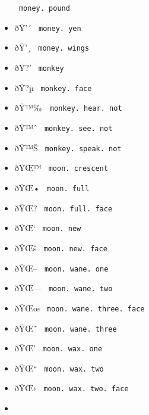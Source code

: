 \begin{itemize}
{  \texttt{\ money.\ pound\ }}
\item
  \label{symbol-money.yen}{{ ðŸ'´ }
  \texttt{\ money.\ yen\ }}
\item
  \label{symbol-money.wings}{{ ðŸ'¸ }
  \texttt{\ money.\ wings\ }}
\item
  \label{symbol-monkey}{{ ðŸ?' } \texttt{\ monkey\ }}
\item
  \label{symbol-monkey.face}{{ ðŸ?µ }
  \texttt{\ monkey.\ face\ }}
\item
  \label{symbol-monkey.hear.not}{{ ðŸ™‰ }
  \texttt{\ monkey.\ hear.\ not\ }}
\item
  \label{symbol-monkey.see.not}{{ ðŸ™ˆ }
  \texttt{\ monkey.\ see.\ not\ }}
\item
  \label{symbol-monkey.speak.not}{{ ðŸ™Š }
  \texttt{\ monkey.\ speak.\ not\ }}
\item
  \label{symbol-moon.crescent}{{ ðŸŒ™ }
  \texttt{\ moon.\ crescent\ }}
\item
  \label{symbol-moon.full}{{ ðŸŒ• }
  \texttt{\ moon.\ full\ }}
\item
  \label{symbol-moon.full.face}{{ ðŸŒ? }
  \texttt{\ moon.\ full.\ face\ }}
\item
  \label{symbol-moon.new}{{ ðŸŒ` }
  \texttt{\ moon.\ new\ }}
\item
  \label{symbol-moon.new.face}{{ ðŸŒš }
  \texttt{\ moon.\ new.\ face\ }}
\item
  \label{symbol-moon.wane.one}{{ ðŸŒ-- }
  \texttt{\ moon.\ wane.\ one\ }}
\item
  \label{symbol-moon.wane.two}{{ ðŸŒ--- }
  \texttt{\ moon.\ wane.\ two\ }}
\item
  \label{symbol-moon.wane.three.face}{{ ðŸŒœ }
  \texttt{\ moon.\ wane.\ three.\ face\ }}
\item
  \label{symbol-moon.wane.three}{{ ðŸŒ˜ }
  \texttt{\ moon.\ wane.\ three\ }}
\item
  \label{symbol-moon.wax.one}{{ ðŸŒ' }
  \texttt{\ moon.\ wax.\ one\ }}
\item
  \label{symbol-moon.wax.two}{{ ðŸŒ`` }
  \texttt{\ moon.\ wax.\ two\ }}
\item
  \label{symbol-moon.wax.two.face}{{ ðŸŒ› }
  \texttt{\ moon.\ wax.\ two.\ face\ }}
\item

\end{itemize}
